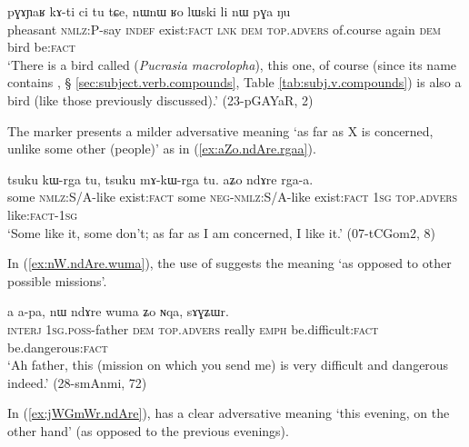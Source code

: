 \begin{exe}
\ex \label{ex:Ro.lWski}
\gll  pɣɤɲaʁ kɤ-ti ci tu tɕe, nɯnɯ ʁo lɯski li nɯ pɣa ŋu \\
pheasant \textsc{nmlz}:P-say \textsc{indef} exist:\textsc{fact} \textsc{lnk} \textsc{dem} \textsc{top}.\textsc{advers} of.course again \textsc{dem} bird be:\textsc{fact} \\
\glt `There is a bird called  (\textit{Pucrasia macrolopha}), this one, of course (since its name contains , § \ref{sec:subject.verb.compounds}, Table \ref{tab:subj.v.compounds}) is also a bird (like those previously discussed).' (23-pGAYaR, 2)
\end{exe}

The marker  presents a milder adversative meaning `as far as X is concerned, unlike some other (people)' as in (\ref{ex:aZo.ndAre.rgaa}).  

\begin{exe}
\ex \label{ex:aZo.ndAre.rgaa}
\gll tsuku kɯ-rga tu, tsuku mɤ-kɯ-rga tu. aʑo ndɤre rga-a. \\
some \textsc{nmlz}:S/A-like exist:\textsc{fact} some \textsc{neg}-\textsc{nmlz}:S/A-like exist:\textsc{fact} \textsc{1sg} \textsc{top.advers} like:\textsc{fact}-\textsc{1sg} \\
\glt `Some like it, some don't; as far as I am concerned, I like it.' (07-tCGom2, 8)
\end{exe}

In (\ref{ex:nW.ndAre.wuma}), the use of  suggests the meaning `as opposed to other possible missions'.

\begin{exe}
\ex \label{ex:nW.ndAre.wuma}
\gll a a-pa, nɯ ndɤre wuma ʑo ɴqa, sɤɣʑɯr. \\
\textsc{interj} \textsc{1sg}.\textsc{poss}-father \textsc{dem} \textsc{top.advers} really \textsc{emph} be.difficult:\textsc{fact} be.dangerous:\textsc{fact} \\
\glt `Ah father, this (mission on which you send me) is very difficult and dangerous indeed.' (28-smAnmi, 72)
\end{exe}

In (\ref{ex:jWGmWr.ndAre}),  has a clear adversative meaning `this evening, on the other hand' (as opposed to the previous evenings).

